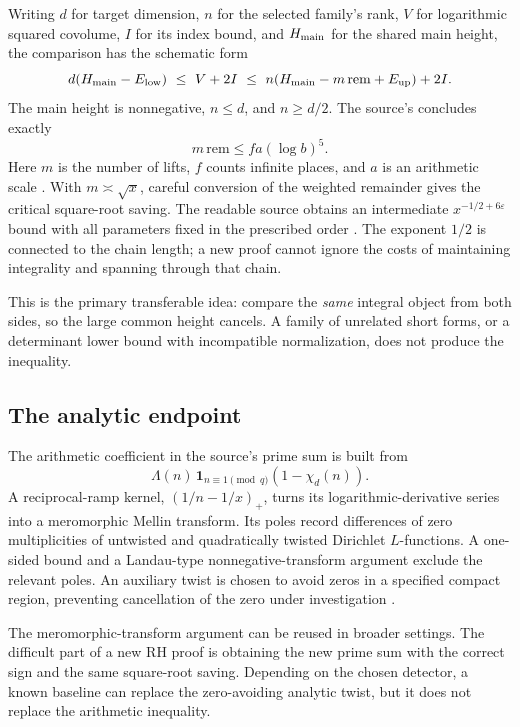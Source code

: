 Writing \(d\) for target dimension, \(n\) for the selected family's rank,
\(V\) for logarithmic squared covolume, \(I\) for its index bound,
and \(H_{\rm main}\) for the shared main height, the comparison has the
schematic form
\[
 d(H_{\rm main}-E_{\rm low})
 \ \le\ V+2I
 \ \le\ n(H_{\rm main}-m\,\mathrm{rem}+E_{\rm up})+2I.
\]
The main height is nonnegative, \(n\le d\), and \(n\ge d/2\).
The source's  concludes exactly
\[
             m\,\mathrm{rem}\le f a(\log b)^5.
\]
Here \(m\) is the number of lifts, \(f\) counts infinite places, and \(a\)
is an arithmetic scale \cite{mainineq}. With \(m\asymp\sqrt{x}\),
careful conversion of the weighted remainder gives the critical
square-root saving. The readable source obtains an intermediate
\(x^{-1/2+6\varepsilon}\) bound with all parameters fixed in the
prescribed order \cite{onesided}. The exponent \(1/2\) is connected to
the chain length; a new proof cannot ignore the costs of maintaining
integrality and spanning through that chain.

This is the primary transferable idea: compare the \emph{same} integral
object from both sides, so the large common height cancels. A family
of unrelated short forms, or a determinant lower bound with incompatible
normalization, does not produce the inequality.

\subsection{The analytic endpoint}

The arithmetic coefficient in the source's prime sum is built from
\[
 \Lambda(n)\,\mathbf1_{n\equiv1\pmod q}(1-\chi_d(n)).
\]
A reciprocal-ramp kernel, \((1/n-1/x)_+\), turns its logarithmic-derivative
series into a meromorphic Mellin transform. Its poles record
differences of zero multiplicities of untwisted and quadratically twisted
Dirichlet \(L\)-functions. A one-sided bound and a Landau-type
nonnegative-transform argument exclude the relevant poles.
An auxiliary twist is chosen to avoid zeros in a specified compact
region, preventing cancellation of the zero under investigation
\cite{criterion,landau}.

The meromorphic-transform argument can be reused in broader settings.
The difficult part of a new RH proof is obtaining the new prime sum
with the correct sign and the same square-root saving. Depending on
the chosen detector, a known baseline can replace the zero-avoiding
analytic twist, but it does not replace the arithmetic inequality.

